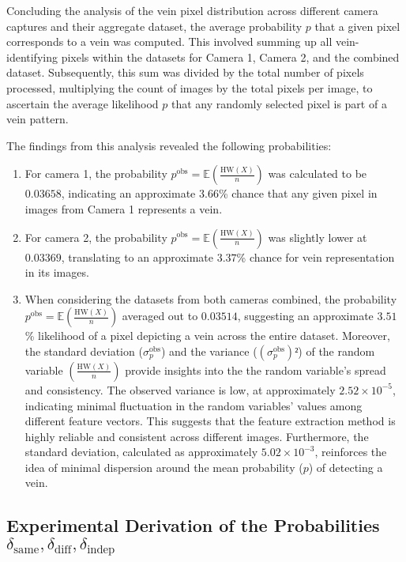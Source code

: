 Concluding the analysis of the vein pixel distribution across different camera captures and their aggregate dataset, the average probability \(p\) that a given pixel corresponds to a vein was computed. This involved summing up all vein-identifying pixels within the datasets for Camera 1, Camera 2, and the combined dataset. Subsequently, this sum was divided by the total number of pixels processed, multiplying the count of images by the total pixels per image, to ascertain the average likelihood \(p\) that any randomly selected pixel is part of a vein pattern.

The findings from this analysis revealed the following probabilities:
\begin{enumerate}
    \item For camera 1, the probability \(p^{\text{obs}} = \mathbb{E}\left( \frac{\text{HW}(X)}{n} \right)\) was calculated to be \(0.03658\), indicating an approximate \(3.66\)\% chance that any given pixel in images from Camera 1 represents a vein.

    \item For camera 2, the probability \(p^{\text{obs}} = \mathbb{E}\left( \frac{\text{HW}(X)}{n} \right)\) was slightly lower at \(0.03369\), translating to an approximate \(3.37\)\% chance for vein representation in its images.

    \item When considering the datasets from both cameras combined, the probability \(p^{\text{obs}} = \mathbb{E}\left( \frac{\text{HW}(X)}{n} \right)\) averaged out to \(0.03514\), suggesting an approximate \(3.51\)\% likelihood of a pixel depicting a vein across the entire dataset. Moreover, the standard deviation (\( \sigma^{\text{obs}}_p \)) and the variance (\((\sigma^{\text{obs}}_p)²\)) of the random variable \(\left( \frac{\text{HW}(X)}{n} \right)\) provide insights into the the random variable's spread and consistency. The observed variance is low, at approximately \( 2.52 \times 10^{-5} \), indicating minimal fluctuation in the random variables' values among different feature vectors. This suggests that the feature extraction method is highly reliable and consistent across different images. Furthermore, the standard deviation, calculated as approximately \( 5.02 \times 10^{-3} \), reinforces the idea of minimal dispersion around the mean probability (\(p\)) of detecting a vein. 
    
\end{enumerate}

\subsection{Experimental Derivation of the Probabilities \(\delta_{\text{same}}, \delta_{\text{diff}}, \delta_{\text{indep}}\)}
\label{sec:delta}

